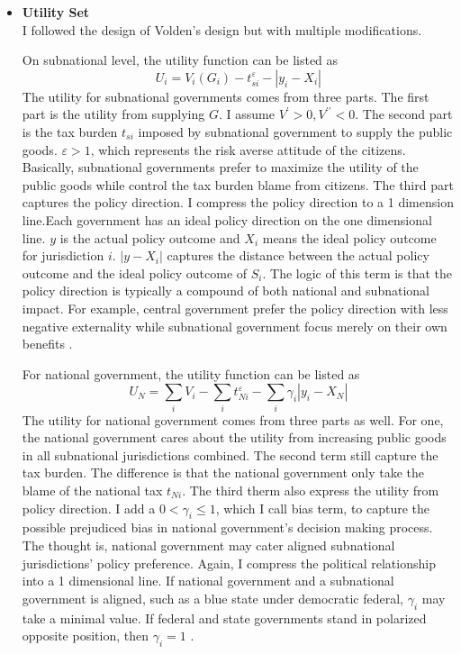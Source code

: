 \begin{itemize}
\item \textbf{Utility Set}\\
I followed the design of Volden's design but with multiple modifications.

On subnational level, the utility function can be listed as
$$U_i=V_i\left(G_i\right)-t_{si}^{\varepsilon}-\left|y_i-X_i\right|$$
The utility for subnational governments comes from three parts. The first part is the utility from supplying $G$. I assume $V^{\prime}>0, V^{\prime \prime}<0$. The second part is the tax burden $t_{si}$ imposed by subnational government to supply the public goods. $\varepsilon >1 $, which represents the risk averse attitude of the citizens. Basically, subnational governments prefer to maximize the utility of the public goods while control the tax burden blame from citizens. The third part captures the policy direction. I compress the policy direction to a 1 dimension line.Each government has an ideal policy direction on the one dimensional line. $y$ is the actual policy outcome and $X_i$ means the ideal policy outcome for jurisdiction $i$. $|y-X_i|$ captures the distance between the actual policy outcome and the ideal policy outcome of $S_i$. The logic of this term is that the policy direction is typically a compound of both national and subnational impact. For example, central government prefer the policy direction with less negative externality while subnational government focus merely on their own benefits \label{iposition}.

For national government, the utility function can be listed as
$$U_N = \sum_i V_i - \sum_i t_{Ni}^{\varepsilon} - \sum_i \gamma_i|y_i-X_N|$$
The utility for national government comes from three parts as well. For one, the national government cares about the utility from increasing public goods in all subnational jurisdictions combined. The second term still capture the tax burden. The difference is that the national government only take the blame of the national tax $t_{Ni}$. The  third therm also express the utility from policy direction. I add a $0<\gamma_i\leq 1$, which I call bias term, to capture the possible prejudiced bias in national government's decision making process. The thought is, national government may cater aligned subnational jurisdictions' policy preference. Again, I compress the political relationship into a 1 dimensional line. If national government and a subnational government is aligned, such as a blue state under democratic federal, $\gamma_i$ may take a minimal value. If federal and state governments stand in polarized opposite position, then $\gamma_i=1 $ \label{actposition}.


\end{itemize}
